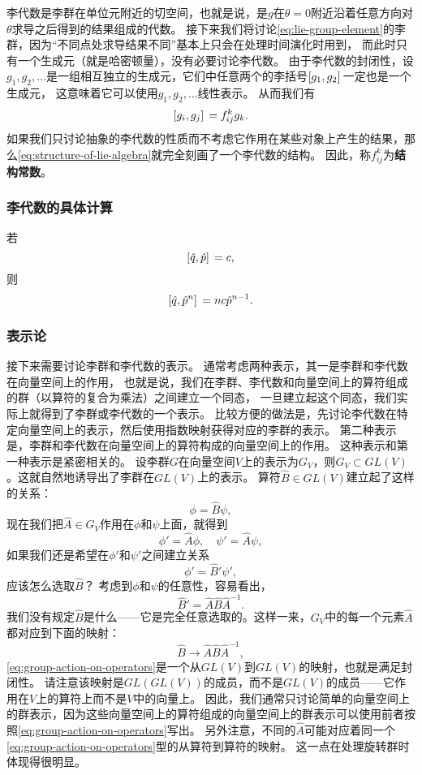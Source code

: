 \documentclass[UTF8, a4paper]{ctexart}
\begin{document}
李代数是李群在单位元附近的切空间，也就是说，是$g$在$\theta=0$附近沿着任意方向对$\theta$求导之后得到的结果组成的代数。
接下来我们将讨论\eqref{eq:lie-group-element}的李群，因为“不同点处求导结果不同”基本上只会在处理时间演化时用到，
而此时只有一个生成元（就是哈密顿量），没有必要讨论李代数。
由于李代数的封闭性，设$g_1, g_2, \ldots$是一组相互独立的生成元，它们中任意两个的李括号$\comm*{g_1}{g_2}$一定也是一个生成元，
这意味着它可以使用$g_1, g_2, \ldots$线性表示。
从而我们有
\begin{equation}
    \comm*{g_i}{g_j} = f_{ij}^k g_k.
    \label{eq:structure-of-lie-algebra}
\end{equation}
如果我们只讨论抽象的李代数的性质而不考虑它作用在某些对象上产生的结果，那么\eqref{eq:structure-of-lie-algebra}就完全刻画了一个李代数的结构。
因此，称$f_{ij}^k$为\textbf{结构常数}。

\subsubsection{李代数的具体计算}

若
\[
    \comm*{\hat{q}}{\hat{p}} = c,
\]
则
\[
    \comm*{\hat{q}}{\hat{p}^n} = n c \hat{p}^{n-1}.
\]

\subsubsection{表示论}\label{sec:rep-th}

接下来需要讨论李群和李代数的表示。
通常考虑两种表示，其一是李群和李代数在向量空间上的作用，
也就是说，我们在李群、李代数和向量空间上的算符组成的群（以算符的复合为乘法）之间建立一个同态，
一旦建立起这个同态，我们实际上就得到了李群或李代数的一个表示。
比较方便的做法是，先讨论李代数在特定向量空间上的表示，然后使用指数映射获得对应的李群的表示。
第二种表示是，李群和李代数在向量空间上的算符构成的向量空间上的作用。
这种表示和第一种表示是紧密相关的。
设李群$G$在向量空间$V$上的表示为$G_V$，则$G_V \subset GL(V)$。这就自然地诱导出了李群在$GL(V)$上的表示。
算符$\hat{B} \in GL(V)$建立起了这样的关系：
\[
    \phi = \hat{B} \psi,
\]
现在我们把$\hat{A} \in G_V$作用在$\phi$和$\psi$上面，就得到
\[
    \phi' = \hat{A} \phi, \quad \psi' = \hat{A} \psi,
\]
如果我们还是希望在$\phi'$和$\psi'$之间建立关系
\[
    \phi' = \hat{B}' \psi',
\]
应该怎么选取$\hat{B}$？
考虑到$\phi$和$\psi$的任意性，容易看出，
\[
    \hat{B}' = \hat{A} \hat{B} \hat{A}^{-1}.
\]
我们没有规定$\hat{B}$是什么——它是完全任意选取的。这样一来，$G_V$中的每一个元素$\hat{A}$都对应到下面的映射：
\begin{equation}
    \hat{B} \longrightarrow \hat{A} \hat{B} \hat{A}^{-1},
    \label{eq:group-action-on-operators}
\end{equation}
\eqref{eq:group-action-on-operators}是一个从$GL(V)$到$GL(V)$的映射，也就是满足封闭性。
请注意该映射是$GL(GL(V))$的成员，而不是$GL(V)$的成员——它作用在$V$上的算符上而不是$V$中的向量上。
因此，我们通常只讨论简单的向量空间上的群表示，因为这些向量空间上的算符组成的向量空间上的群表示可以使用前者按照\eqref{eq:group-action-on-operators}写出。
另外注意，不同的$\hat{A}$可能对应着同一个\eqref{eq:group-action-on-operators}型的从算符到算符的映射。
这一点在处理旋转群时体现得很明显。
\end{document}

